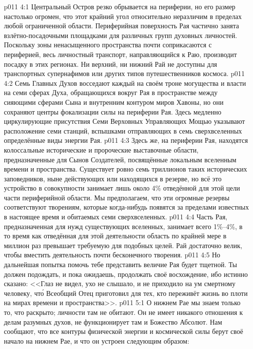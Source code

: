 \vs p011 4:1 Центральный Остров резко обрывается на периферии, но его размер настолько огромен, что этот крайний угол относительно неразличим в пределах любой ограниченной области. Периферийная поверхность Рая частично занята взлётно\hyp{}посадочными площадками для различных групп духовных личностей. Поскольку зоны ненасыщенного пространства почти соприкасаются с периферией, весь личностный транспорт, направляющийся к Раю, производит посадку в этих регионах. Ни верхний, ни нижний Рай не доступны для транспортных супернафимов или других типов путешественников космоса.
\vs p011 4:2 Семь Главных Духов восседают каждый на своём троне могущества и власти на семи сферах Духа, обращающихся вокруг Рая в пространстве между сияющими сферами Сына и внутренним контуром миров Хавоны, но они сохраняют центры фокализации силы на периферии Рая. Здесь медленно циркулирующие присутствия Семи Верховных Управляющих Мощью указывают расположение семи станций, вспышками отправляющих в семь сверхвселенных определённые виды энергии Рая.
\vs p011 4:3 Здесь же, на периферии Рая, находятся колоссальные исторические и пророческие выставочные области, предназначенные для Сынов Создателей, посвящённые локальным вселенным времени и пространства. Существует ровно семь триллионов таких исторических заповедников, ныне действующих или находящихся в резерве, но всё это устройство в совокупности занимает лишь около 4\% отведённой для этой цели части периферийной области. Мы предполагаем, что эти огромные резервы соответствуют творениям, которые когда\hyp{}нибудь появятся за пределами известных в настоящее время и обитаемых семи сверхвселенных.
\vs p011 4:4 Часть Рая, предназначенная для нужд существующих вселенных, занимает всего 1\%--4\%, в то время как отведённая для этой деятельности область по крайней мере в миллион раз превышает требуемую для подобных целей. Рай достаточно велик, чтобы вместить деятельность почти бесконечного творения.
\vs p011 4:5 Но дальнейшая попытка помочь тебе представить величие Рая будет тщетной. Ты должен подождать, и пока ожидаешь, продолжать своё восхождение, ибо истинно сказано: <<Глаз не видел, ухо не слышало, и не приходило на ум смертному человеку, чт\'о Всеобщий Отец приготовил для тех, кто переживёт жизнь во плоти на мирах времени и пространства>>.
\vs p011 5:1 О нижнем Рае мы знаем только то, что раскрыто; личности там не обитают. Он не имеет никакого отношения к делам разумных духов, не функционирует там и Божество Абсолют. Нам сообщают, что все контуры физической энергии и космической силы берут своё начало на нижнем Рае, и что он устроен следующим образом:
